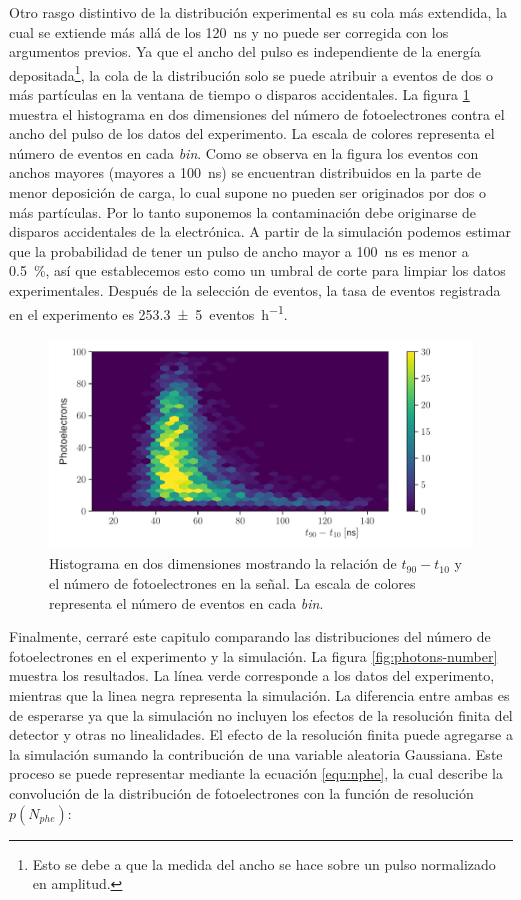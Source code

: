 Otro rasgo distintivo de la distribución experimental es su cola más extendida, la cual se extiende más allá de los \SI{120}{\ns} y no puede ser corregida con los argumentos previos. Ya que el ancho del pulso es independiente de la energía depositada\footnote{Esto se debe a que la medida del ancho se hace sobre un pulso normalizado en amplitud.}, la cola de la distribución solo se puede atribuir a eventos de dos o más partículas en la ventana de tiempo o disparos accidentales. La figura \ref{fig:qtime-dist} muestra el histograma en dos dimensiones del número de fotoelectrones contra el ancho del pulso de los datos del experimento. La escala de colores representa el número de eventos en cada \emph{bin}. Como se observa en la figura los eventos con anchos mayores (mayores a \SI{100}{\ns}) se encuentran distribuidos en la parte de menor deposición de carga, lo cual supone no pueden ser originados por dos o más partículas. Por lo tanto suponemos la contaminación debe originarse de disparos accidentales de la electrónica. A partir de la simulación podemos estimar que la probabilidad de tener un pulso de ancho mayor a \SI{100}{\ns} es menor a \SI{0.5}{\percent}, así que establecemos esto como un umbral de corte para limpiar los datos experimentales. Después de la selección de eventos, la tasa de eventos registrada en el experimento es \SI{253.3(50)}{eventos\per\hour}.

\begin{figure}
        \centering
        \includegraphics[width=\textwidth]{qtime-dist.pdf}
        \caption{Histograma en dos dimensiones mostrando la relación de $t_{90}-t_{10}$ y el número de fotoelectrones en la señal. La escala de colores representa el número de eventos en cada \emph{bin}.}
        \label{fig:qtime-dist}
\end{figure}

Finalmente, cerraré este capitulo comparando las distribuciones del número de fotoelectrones en el experimento y la simulación. La figura \ref{fig:photons-number} muestra los resultados. La línea verde corresponde a los datos del experimento, mientras que la linea negra representa la simulación. La diferencia entre ambas es de esperarse ya que la simulación no incluyen los efectos de la resolución finita del detector y otras no linealidades. El efecto de la resolución finita puede agregarse a la simulación sumando la contribución de una variable aleatoria Gaussiana. Este proceso se puede representar mediante la ecuación \ref{equ:nphe}, la cual describe la convolución de la distribución de fotoelectrones con la función de resolución $p(N_{phe})$:

